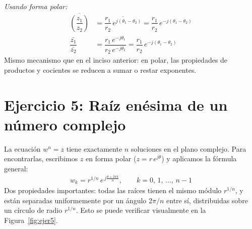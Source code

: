 \documentclass[10pt,a4paper]{article}
\begin{document}
\begin{enumerate}[label=\textbf{\alph*)}]
	\textit{Usando forma polar:}
	\begin{align*}
		\overline{\left(\dfrac{z_1}{z_2}\right)} &= \overline{\dfrac{r_1}{r_2}\, e^{j(\theta_1-\theta_2)}} = \dfrac{r_1}{r_2}\, e^{-j(\theta_1-\theta_2)} \\[4pt]
		\dfrac{\bar{z_1}}{\bar{z_2}} &= \dfrac{r_1\, e^{-j\theta_1}}{r_2\, e^{-j\theta_2}} = \dfrac{r_1}{r_2}\, e^{-j(\theta_1-\theta_2)}
	\end{align*}
	Mismo mecanismo que en el inciso anterior: en polar, las propiedades de productos y cocientes se reducen a sumar o restar exponentes.

\end{enumerate}

\section*{Ejercicio 5: Raíz enésima de un número complejo}

La ecuación $w^n = z$ tiene exactamente $n$ soluciones en el plano complejo. Para encontrarlas, escribimos $z$ en forma polar ($z = r\,e^{j\theta}$) y aplicamos la fórmula general:
\begin{align*}
	w_k = r^{1/n}\, e^{\,j\frac{\theta + 2\pi k}{n}}, \qquad k = 0,\, 1,\, \ldots,\, n-1
\end{align*}
Dos propiedades importantes: todas las raíces tienen el mismo módulo $r^{1/n}$, y están separadas uniformemente por un ángulo $2\pi/n$ entre sí, distribuidas sobre un círculo de radio $r^{1/n}$. Esto se puede verificar visualmente en la Figura~\ref{fig:ejer5}.
\end{document}
